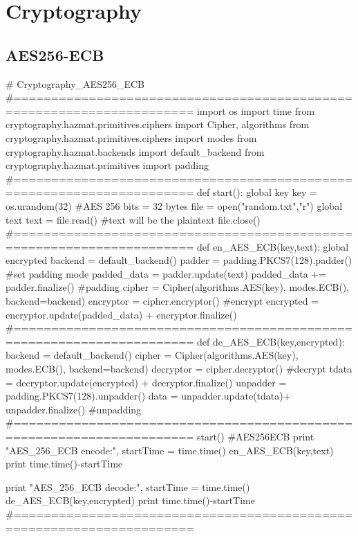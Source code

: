\documentclass{article}
\begin{document}
\section{Cryptography}
\subsection{AES256-ECB}
\begin{python}
# Cryptography_AES256_ECB
#======================================================================
import os
import time
from cryptography.hazmat.primitives.ciphers import Cipher, algorithms
from cryptography.hazmat.primitives.ciphers import modes
from cryptography.hazmat.backends import default_backend
from cryptography.hazmat.primitives import padding
#======================================================================
def start():
    global key
    key = os.urandom(32)                    #AES 256 bits = 32 bytes
    file = open("random.txt","r")
    global text 
    text = file.read()                      #text will be the plaintext
    file.close()
#======================================================================
def en_AES_ECB(key,text):
    global encrypted
    backend = default_backend()
    padder = padding.PKCS7(128).padder()              #set padding mode
    padded_data = padder.update(text)
    padded_data += padder.finalize()                           #padding
    cipher = Cipher(algorithms.AES(key), modes.ECB(), backend=backend)
    encryptor = cipher.encryptor()
    #encrypt
    encrypted = encryptor.update(padded_data) + encryptor.finalize()
#======================================================================
def de_AES_ECB(key,encrypted):
    backend = default_backend()
    cipher = Cipher(algorithms.AES(key), modes.ECB(), backend=backend) 
    decryptor = cipher.decryptor()
    #decrypt
    tdata = decryptor.update(encrypted) + decryptor.finalize()
    unpadder = padding.PKCS7(128).unpadder()    
    data = unpadder.update(tdata)+ unpadder.finalize()       #unpadding
#======================================================================
start()
#AES256ECB
print "AES_256_ECB encode:",
startTime = time.time()
en_AES_ECB(key,text)
print time.time()-startTime

print "AES_256_ECB decode:",
startTime = time.time()
de_AES_ECB(key,encrypted)
print time.time()-startTime
#======================================================================
\end{python}
\newpage
\end{document}
